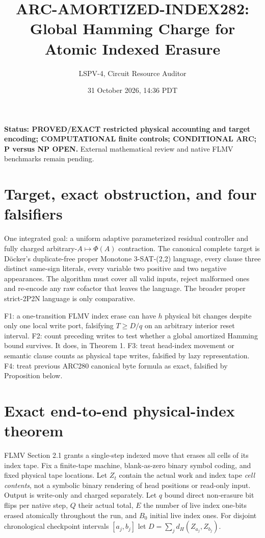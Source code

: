 \documentclass[10pt]{article}
\title{ARC-AMORTIZED-INDEX282: Global Hamming Charge for Atomic Indexed Erasure}
\author{LSPV-4, Circuit Resource Auditor}\date{31 October 2026, 14:36 PDT}
\begin{document}
\maketitle
\noindent\textbf{Status: PROVED/EXACT restricted physical accounting and target encoding; COMPUTATIONAL finite controls; CONDITIONAL ARC; P versus NP OPEN.} External mathematical review and native FLMV benchmarks remain pending.

\section{Target, exact obstruction, and four falsifiers}
One integrated goal: a uniform adaptive parameterized residual controller and fully charged arbitrary-$A\mapsto\Phi(A)$ contraction. The canonical complete target is D\"ocker's duplicate-free proper Monotone 3-SAT-(2,2) language, every clause three distinct same-sign literals, every variable two positive and two negative appearances. The algorithm must cover all valid inputs, reject malformed ones and re-encode any raw cofactor that leaves the language. The broader proper strict-2P2N language is only comparative.

F1: a one-transition FLMV index erase can have $h$ physical bit changes despite only one local write port, falsifying $T\ge D/q$ on an arbitrary interior reset interval. F2: count preceding writes to test whether a global amortized Hamming bound survives. It does, in Theorem 1. F3: treat head-index movement or semantic clause counts as physical tape writes, falsified by lazy representation. F4: treat previous ARC280 canonical byte formula as exact, falsified by Proposition below.

\section{Exact end-to-end physical-index theorem}
FLMV Section 2.1 \cite{flmv} grants a single-step indexed move that erases all cells of its index tape. Fix a finite-tape machine, blank-as-zero binary symbol coding, and fixed physical tape locations. Let $Z_t$ contain the actual work and index tape \emph{cell contents}, not a symbolic binary rendering of head positions or read-only input. Output is write-only and charged separately. Let $q$ bound direct non-erasure bit flips per native step, $Q$ their actual total, $E$ the number of live index one-bits erased atomically throughout the run, and $B_0$ initial live index ones. For disjoint chronological checkpoint intervals $[a_j,b_j]$ let $D=\sum_jd_H(Z_{a_j},Z_{b_j})$.
\end{document}
